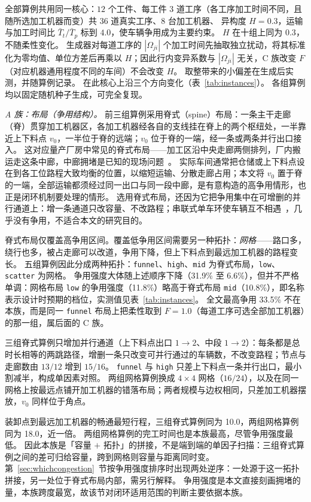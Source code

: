 \documentclass[manuscript,screen,review]{acmart}
\newcommand{\ContentionLo}{6.6\%}
\newcommand{\ContentionHi}{33.5\%}
\newcommand{\ContentionAHi}{31.9\%}
\newcommand{\ContentionALow}{11.8\%}
\newcommand{\ContentionAMid}{10.8\%}
\newcommand{\LegDumbbell}{10.0}          %
\newcommand{\LegGrid}{18.0}              %
\begin{document}
全部算例共用同一核心：$12$ 个工件、每工件 $3$ 道工序（各工序加工时间不同，且随所选加工机器而变）共 $36$ 道真实工序、$8$ 台加工机器、
异构度 $H=0.3$，运输与加工时间比 $\bar{T}_t/\bar{T}_p$ 标到 $4.0$，使车辆争用成为主要约束。
$H$ 在十组上同为 $0.3$，不随柔性变化。
生成器对每道工序的 $|\Omega_{ji}|$ 个加工时间先抽取独立扰动，将其标准化为零均值、单位方差后再乘以 $H$；因此行内变异系数与 $|\Omega_{ji}|$ 无关，C 族改变 $F$（对应机器通用程度不同的车间）不会改变 $H$。
取整带来的小偏差在生成后实测，并随算例记录。
在此核心上沿三个方向变化（表~\ref{tab:instances}）。
各组算例均以固定随机种子生成，可完全复现。

\emph{A 族：布局（争用结构）。}
前三组算例采用脊式（spine）布局：一条主干走廊（脊）贯穿加工机器区，各加工机器经各自的支线挂在脊上的两个枢纽处，一半靠近上下料点 $v_0$，一半位于脊的远端；$v_0$ 位于脊的一端，经一条或两条并行出口接入。
这对应量产厂房中常见的脊式布局——加工区沿中央走廊两侧排列，厂内搬运走这条中廊，中廊拥堵是已知的现场问题~\cite{suh2022spine}。
实际车间通常把仓储或上下料点设在到各工位路程大致均衡的位置，以缩短运输、分散走廊占用；本文将 $v_0$ 置于脊的一端，全部运输都须经过同一出口与同一段中廊，是有意构造的高争用情形，也正是闭环机制要处理的情形。
选用脊式布局，还因为它把争用集中在可增删的并行通道上：增一条通道只改容量、不改路程；串联式单车环使车辆互不相遇~\cite{rahimikelarijani2020tandem}，几乎没有争用，不适合本文的研究目的。

脊式布局仅覆盖高争用区间。覆盖低争用区间需要另一种拓扑：\emph{网格}——路口多，绕行也多，被占走廊可以改道，争用下降，但上下料点到最远加工机器的路程变长。
五组算例因此分成两种拓扑：\texttt{funnel}、\texttt{high}、\texttt{mid} 为脊式布局，\texttt{low}、\texttt{scatter} 为网格。
争用强度大体随上述顺序下降（\ContentionAHi{} 至 \ContentionLo{}），但并不严格单调：网格布局 \texttt{low} 的争用强度（\ContentionALow{}）略高于脊式布局 \texttt{mid}（\ContentionAMid{}），即名称表示设计时预期的档位，实测值见表~\ref{tab:instances}。
全文最高争用 \ContentionHi{} 不在本族，而是同一 \texttt{funnel} 布局上把柔性取到 $F=1.0$（每道工序可选全部加工机器）的那一组，属后面的 C 族。

三组脊式算例只增加并行通道（上下料点出口 $1\to2$、中段 $1\to2$）：每条都是总时长相等的两跳路径，增删一条只改变可并行通过的车辆数，不改变路程；节点与走廊数由 $13/12$ 增到 $15/16$。
\texttt{funnel} 与 \texttt{high} 只差上下料点一条并行出口，最小割减半，构成单因素对照。
两组网格算例换成 $4\times4$ 网格（$16/24$），以及在同一网格上按最远点铺开加工机器的错落布局；两者规模与边权相同，只差加工机器摆放，$v_0$ 同样位于角点。

装卸点到最远加工机器的畅通最短行程，三组脊式算例同为 \LegDumbbell{}，两组网格算例同为 \LegGrid{}，近一倍。
两组网格算例的完工时间也是本族最高，尽管争用强度最低。
因此本族是「容量 $+$ 拓扑」的拼接，不是端到端的单因子扫描：三组脊式算例之间的差可归给容量，跨到网格则容量与距离同时变。
第~\ref{sec:whichcongestion}~节按争用强度排序时出现两处逆序：一处源于这一拓扑拼接，另一处位于脊式布局内部，需另行解释。
争用强度是本文直接刻画拥堵的量，本族跨度最宽，故该节对闭环适用范围的判断主要依据本族。
\end{document}
